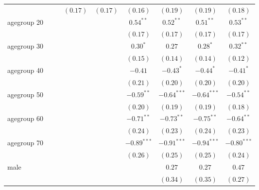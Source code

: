 \begin{table}
\begin{center}
\begin{tabular}{l c c c c c c c c}
                &              &              & $(0.17)$     & $(0.17)$     & $(0.16)$      & $(0.19)$      & $(0.19)$      & $(0.18)$      \\
agegroup 20     &              &              &              &              & $0.54^{**}$   & $0.52^{**}$   & $0.51^{**}$   & $0.53^{**}$   \\
                &              &              &              &              & $(0.17)$      & $(0.17)$      & $(0.17)$      & $(0.17)$      \\
agegroup 30     &              &              &              &              & $0.30^{*}$    & $0.27$        & $0.28^{*}$    & $0.32^{**}$   \\
                &              &              &              &              & $(0.15)$      & $(0.14)$      & $(0.14)$      & $(0.12)$      \\
agegroup 40     &              &              &              &              & $-0.41$       & $-0.43^{*}$   & $-0.44^{*}$   & $-0.41^{*}$   \\
                &              &              &              &              & $(0.21)$      & $(0.20)$      & $(0.20)$      & $(0.20)$      \\
agegroup 50     &              &              &              &              & $-0.59^{**}$  & $-0.64^{***}$ & $-0.64^{***}$ & $-0.54^{**}$  \\
                &              &              &              &              & $(0.20)$      & $(0.19)$      & $(0.19)$      & $(0.18)$      \\
agegroup 60     &              &              &              &              & $-0.71^{**}$  & $-0.73^{**}$  & $-0.75^{**}$  & $-0.64^{**}$  \\
                &              &              &              &              & $(0.24)$      & $(0.23)$      & $(0.24)$      & $(0.23)$      \\
agegroup 70     &              &              &              &              & $-0.89^{***}$ & $-0.91^{***}$ & $-0.94^{***}$ & $-0.80^{***}$ \\
                &              &              &              &              & $(0.26)$      & $(0.25)$      & $(0.25)$      & $(0.24)$      \\
male            &              &              &              &              &               & $0.27$        & $0.27$        & $0.47$        \\
                &              &              &              &              &               & $(0.34)$      & $(0.35)$      & $(0.27)$      \\

\end{tabular}
\end{center}
\end{table}
